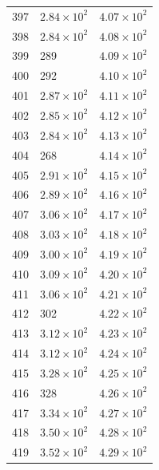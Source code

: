 \begin{table}[H]
\begin{tabular}{lll}
397 & $\displaystyle 2.84 \times 10^{2}$ & $\displaystyle 4.07 \times 10^{2}$ \\
398 & $\displaystyle 2.84 \times 10^{2}$ & $\displaystyle 4.08 \times 10^{2}$ \\
399 & 289 & $\displaystyle 4.09 \times 10^{2}$ \\
400 & 292 & $\displaystyle 4.10 \times 10^{2}$ \\
401 & $\displaystyle 2.87 \times 10^{2}$ & $\displaystyle 4.11 \times 10^{2}$ \\
402 & $\displaystyle 2.85 \times 10^{2}$ & $\displaystyle 4.12 \times 10^{2}$ \\
403 & $\displaystyle 2.84 \times 10^{2}$ & $\displaystyle 4.13 \times 10^{2}$ \\
404 & 268 & $\displaystyle 4.14 \times 10^{2}$ \\
405 & $\displaystyle 2.91 \times 10^{2}$ & $\displaystyle 4.15 \times 10^{2}$ \\
406 & $\displaystyle 2.89 \times 10^{2}$ & $\displaystyle 4.16 \times 10^{2}$ \\
407 & $\displaystyle 3.06 \times 10^{2}$ & $\displaystyle 4.17 \times 10^{2}$ \\
408 & $\displaystyle 3.03 \times 10^{2}$ & $\displaystyle 4.18 \times 10^{2}$ \\
409 & $\displaystyle 3.00 \times 10^{2}$ & $\displaystyle 4.19 \times 10^{2}$ \\
410 & $\displaystyle 3.09 \times 10^{2}$ & $\displaystyle 4.20 \times 10^{2}$ \\
411 & $\displaystyle 3.06 \times 10^{2}$ & $\displaystyle 4.21 \times 10^{2}$ \\
412 & 302 & $\displaystyle 4.22 \times 10^{2}$ \\
413 & $\displaystyle 3.12 \times 10^{2}$ & $\displaystyle 4.23 \times 10^{2}$ \\
414 & $\displaystyle 3.12 \times 10^{2}$ & $\displaystyle 4.24 \times 10^{2}$ \\
415 & $\displaystyle 3.28 \times 10^{2}$ & $\displaystyle 4.25 \times 10^{2}$ \\
416 & 328 & $\displaystyle 4.26 \times 10^{2}$ \\
417 & $\displaystyle 3.34 \times 10^{2}$ & $\displaystyle 4.27 \times 10^{2}$ \\
418 & $\displaystyle 3.50 \times 10^{2}$ & $\displaystyle 4.28 \times 10^{2}$ \\
419 & $\displaystyle 3.52 \times 10^{2}$ & $\displaystyle 4.29 \times 10^{2}$ \\

\end{tabular}
\end{table}
